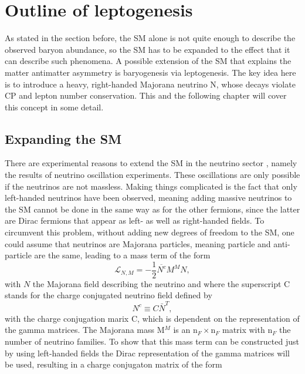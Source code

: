 \chapter{Outline of leptogenesis}
As stated in the section before, the SM alone is not quite enough to describe the observed baryon abundance, so the SM has to be expanded to the effect that it can describe such phenomena. \newline\indent
A possible extension of the SM that explains the matter antimatter asymmetry is baryogenesis via leptogenesis. The key idea here is to introduce a heavy, right-handed Majorana neutrino N, whose decays violate CP and lepton number conservation. \newline\indent
This and the following chapter will cover this concept in some detail.
\section{Expanding the SM}
There are experimental reasons to extend the SM in the neutrino sector , namely the results of neutrino oscillation experiments. These oscillations are only possible if the neutrinos are not massless. Making things complicated is the fact that only left-handed neutrinos have been observed, meaning adding massive neutrinos to the SM cannot be done in the same way as for the other fermions, since the latter are Dirac fermions that appear as left- as well as right-handed fields. To circumvent this problem, without adding new degrees of freedom to the SM, one could assume that neutrinos are Majorana particles, meaning particle and anti-particle are the same, leading to a mass term of the form \cite{Drewes:2013gca}
\begin{equation}
\mathcal{L}_{N,M}=-\frac{1}{2}\overline{N^c}M^MN,
\label{eq:neutrino_majorana}
\end{equation}
with $N$ the Majorana field describing the neutrino and where the superscript C stands for the charge conjugated neutrino field defined by
\begin{equation*}
	N^c\equiv C\bar{N}^T,
\end{equation*}
with the charge conjugation marix C, which is dependent on the representation of the gamma matrices. The Majorana mass M$^M$ is an n$_F\times$n$_F$ matrix with n$_F$ the number of neutrino families. \newline\indent
To show that this mass term can be constructed just by using left-handed fields the Dirac representation of the gamma matrices will be used, resulting in a charge conjugaton matrix of the form
